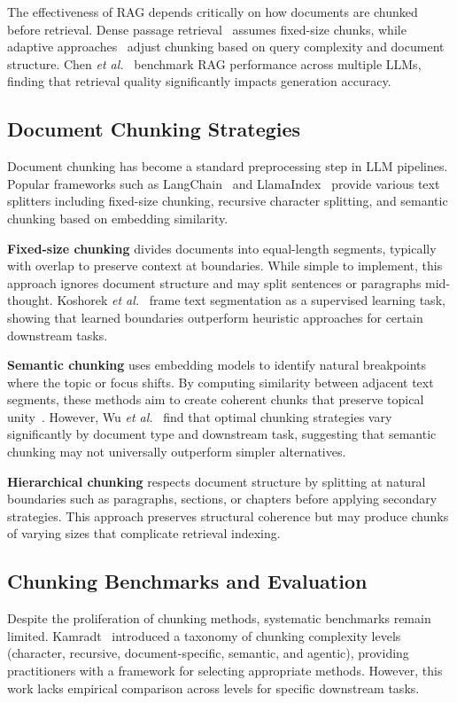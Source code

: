 \documentclass{ieeeaccess}
\begin{document}
The effectiveness of RAG depends critically on how documents are chunked before retrieval. Dense passage retrieval~\cite{b4} assumes fixed-size chunks, while adaptive approaches~\cite{b5} adjust chunking based on query complexity and document structure. Chen \emph{et al.}~\cite{b6} benchmark RAG performance across multiple LLMs, finding that retrieval quality significantly impacts generation accuracy.

\subsection{Document Chunking Strategies}

Document chunking has become a standard preprocessing step in LLM pipelines. Popular frameworks such as LangChain~\cite{b7} and LlamaIndex~\cite{b8} provide various text splitters including fixed-size chunking, recursive character splitting, and semantic chunking based on embedding similarity.

\textbf{Fixed-size chunking} divides documents into equal-length segments, typically with overlap to preserve context at boundaries. While simple to implement, this approach ignores document structure and may split sentences or paragraphs mid-thought. Koshorek \emph{et al.}~\cite{b9} frame text segmentation as a supervised learning task, showing that learned boundaries outperform heuristic approaches for certain downstream tasks.

\textbf{Semantic chunking} uses embedding models to identify natural breakpoints where the topic or focus shifts. By computing similarity between adjacent text segments, these methods aim to create coherent chunks that preserve topical unity~\cite{b10}. However, Wu \emph{et al.}~\cite{b11} find that optimal chunking strategies vary significantly by document type and downstream task, suggesting that semantic chunking may not universally outperform simpler alternatives.

\textbf{Hierarchical chunking} respects document structure by splitting at natural boundaries such as paragraphs, sections, or chapters before applying secondary strategies. This approach preserves structural coherence but may produce chunks of varying sizes that complicate retrieval indexing.

\subsection{Chunking Benchmarks and Evaluation}

Despite the proliferation of chunking methods, systematic benchmarks remain limited. Kamradt~\cite{b12} introduced a taxonomy of chunking complexity levels (character, recursive, document-specific, semantic, and agentic), providing practitioners with a framework for selecting appropriate methods. However, this work lacks empirical comparison across levels for specific downstream tasks.
\end{document}
